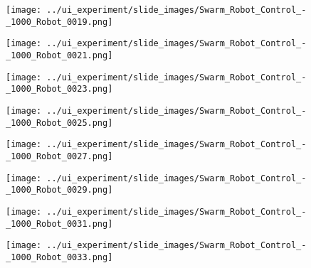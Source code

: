 \begin{minipage}{\linewidth}
	\centering
	\begin{minipage}{0.42\linewidth}
		\centering
		\texttt{[image: ../ui\_experiment/slide\_images/Swarm\_Robot\_Control\_-\_1000\_Robot\_0019.png]}
		\label{fig:sub1}
	\end{minipage}
	\hspace{0.05\linewidth}
	\begin{minipage}{0.42\linewidth}
		\texttt{[image: ../ui\_experiment/slide\_images/Swarm\_Robot\_Control\_-\_1000\_Robot\_0021.png]}
		\label{fig:sub2}
	\end{minipage}
\end{minipage}

\begin{minipage}{\linewidth}
	\centering
	\begin{minipage}{0.42\linewidth}
		\texttt{[image: ../ui\_experiment/slide\_images/Swarm\_Robot\_Control\_-\_1000\_Robot\_0023.png]}
		\label{fig:sub1}
	\end{minipage}
	\hspace{0.05\linewidth}
	\begin{minipage}{0.42\linewidth}
		\texttt{[image: ../ui\_experiment/slide\_images/Swarm\_Robot\_Control\_-\_1000\_Robot\_0025.png]}
		\label{fig:sub1}
	\end{minipage}
\end{minipage}

\begin{minipage}{\linewidth}
	\centering
	\begin{minipage}{0.42\linewidth}
		\texttt{[image: ../ui\_experiment/slide\_images/Swarm\_Robot\_Control\_-\_1000\_Robot\_0027.png]}
		\label{fig:sub2}
	\end{minipage}
	\hspace{0.05\linewidth}
	\begin{minipage}{0.42\linewidth}
		\texttt{[image: ../ui\_experiment/slide\_images/Swarm\_Robot\_Control\_-\_1000\_Robot\_0029.png]}
		\label{fig:sub1}
	\end{minipage}
\end{minipage}

\begin{minipage}{\linewidth}
	\centering
	\begin{minipage}{0.42\linewidth}
		\texttt{[image: ../ui\_experiment/slide\_images/Swarm\_Robot\_Control\_-\_1000\_Robot\_0031.png]}
		\label{fig:sub2}
	\end{minipage}
	\hspace{0.05\linewidth}
	\begin{minipage}{0.42\linewidth}
		\texttt{[image: ../ui\_experiment/slide\_images/Swarm\_Robot\_Control\_-\_1000\_Robot\_0033.png]}
		\label{fig:sub1}
	\end{minipage}
\end{minipage}

